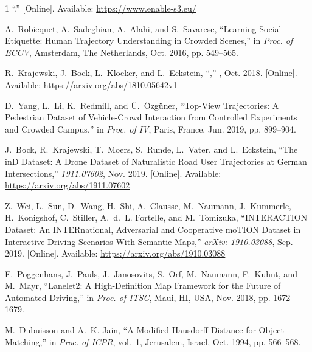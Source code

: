 \documentclass[a4paper, 10pt, conference]{ieeeconf}      %
\begin{document}
\begin{thebibliography}{1}
\BIBentryALTinterwordspacing
``.'' [Online]. Available:
  \url{https://www.enable-s3.eu/}
\BIBentrySTDinterwordspacing

A.~Robicquet, A.~Sadeghian, A.~Alahi, and S.~Savarese, ``Learning {Social}
  {Etiquette}: {Human} {Trajectory} {Understanding} in {Crowded} {Scenes},'' in
  \emph{Proc. of {ECCV}}, Amsterdam, The Netherlands, Oct. 2016, pp. 549--565.

\BIBentryALTinterwordspacing
R.~Krajewski, J.~Bock, L.~Kloeker, and L.~Eckstein,
  ``,''
  \emph{}, Oct. 2018. [Online].
  Available: \url{https://arxiv.org/abs/1810.05642v1}
\BIBentrySTDinterwordspacing

D.~Yang, L.~Li, K.~Redmill, and {\"U}.~{\"O}zg{\"u}ner, ``Top-{View}
  {Trajectories}: {A} {Pedestrian} {Dataset} of {Vehicle}-{Crowd} {Interaction}
  from {Controlled} {Experiments} and {Crowded} {Campus},'' in \emph{Proc. of
  {IV}}, Paris, France, Jun. 2019, pp. 899--904.

\BIBentryALTinterwordspacing
J.~Bock, R.~Krajewski, T.~Moers, S.~Runde, L.~Vater, and L.~Eckstein, ``The
  {inD} {Dataset}: {A} {Drone} {Dataset} of {Naturalistic} {Road} {User}
  {Trajectories} at {German} {Intersections},'' \emph{1911.07602}, Nov. 2019.
  [Online]. Available: \url{https://arxiv.org/abs/1911.07602}
\BIBentrySTDinterwordspacing

\BIBentryALTinterwordspacing
Z.~Wei, L.~Sun, D.~Wang, H.~Shi, A.~Clausse, M.~Naumann, J.~Kummerle,
  H.~Konigshof, C.~Stiller, A.~d.~L. Fortelle, and M.~Tomizuka, ``{INTERACTION}
  {Dataset}: {An} {INTERnational}, {Adversarial} and {Cooperative} {moTION}
  {Dataset} in {Interactive} {Driving} {Scenarios} {With} {Semantic} {Maps},''
  \emph{arXiv: 1910.03088}, Sep. 2019. [Online]. Available:
  \url{https://arxiv.org/abs/1910.03088}
\BIBentrySTDinterwordspacing

F.~Poggenhans, J.~Pauls, J.~Janosovits, S.~Orf, M.~Naumann, F.~Kuhnt, and
  M.~Mayr, ``Lanelet2: {A} {High}-{Definition} {Map} {Framework} for the
  {Future} of {Automated} {Driving},'' in \emph{Proc. of {ITSC}}, Maui, HI,
  USA, Nov. 2018, pp. 1672--1679.

M.~Dubuisson and A.~K. Jain, ``A {Modified} {Hausdorff} {Distance} for {Object}
  {Matching},'' in \emph{Proc. of {ICPR}}, vol.~1, Jerusalem, Israel, Oct.
  1994, pp. 566--568.

\end{thebibliography}
\end{document}
